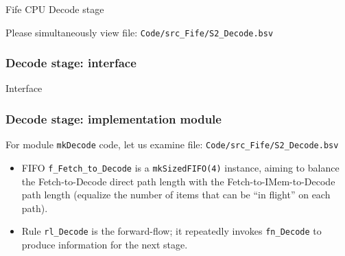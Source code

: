 \begin{frame}[fragile]

\begin{center}
  {\LARGE Fife CPU Decode stage}

  \vspace{10ex}

  Please simultaneously view file: \hm \verb|Code/src_Fife/S2_Decode.bsv|
\end{center}

\end{frame}


\begin{frame}[fragile]
\frametitle{Decode stage: interface}

\footnotesize

\begin{minipage}{0.725\textwidth}
\end{minipage}
\hmm
Interface

\end{frame}


\begin{frame}[fragile]
\frametitle{Decode stage: implementation module}

\footnotesize

For module {\tt mkDecode} code, let us examine file: \verb|Code/src_Fife/S2_Decode.bsv|

\begin{itemize}

\vspace{4ex}

 \item FIFO \verb|f_Fetch_to_Decode| is a {\tt mkSizedFIFO(4)}
       instance, aiming to balance the Fetch-to-Decode direct path
       length with the Fetch-to-IMem-to-Decode path length (equalize
       the number of items that can be ``in flight'' on each path).

 \vspace{5ex}

 \item Rule \verb|rl_Decode| is the forward-flow;
       it repeatedly invokes \verb|fn_Decode| to produce
       information for the next stage.

\end{itemize}

\end{frame}

